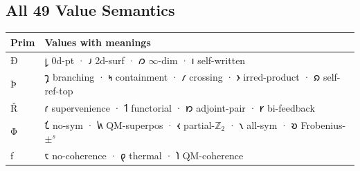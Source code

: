 \documentclass[12pt,a4paper]{article}
\newcommand{\heb}[1]{{\igprimfont #1}}
\begin{document}
\hypertarget{all-49-value-semantics}{%
\subsection{All 49 Value Semantics}\label{all-49-value-semantics}}

\begin{longtable}[]{@{}ll@{}}
\toprule
\begin{minipage}[b]{0.47\columnwidth}\raggedright
Prim\strut
\end{minipage} & \begin{minipage}[b]{0.47\columnwidth}\raggedright
Values with meanings\strut
\end{minipage}\tabularnewline
\midrule
\endhead
\begin{minipage}[t]{0.47\columnwidth}\raggedright
\heb{Ð}\strut
\end{minipage} & \begin{minipage}[t]{0.47\columnwidth}\raggedright
𐑛 0d-pt · 𐑨 2d-surf · 𐑼 \(\infty\)-dim · 𐑦 self-written\strut
\end{minipage}\tabularnewline
\begin{minipage}[t]{0.47\columnwidth}\raggedright
\heb{Þ}\strut
\end{minipage} & \begin{minipage}[t]{0.47\columnwidth}\raggedright
𐑡 branching · 𐑰 containment · 𐑥 crossing · 𐑶 irred-product · 𐑸
self-ref-top\strut
\end{minipage}\tabularnewline
\begin{minipage}[t]{0.47\columnwidth}\raggedright
\heb{Ř}\strut
\end{minipage} & \begin{minipage}[t]{0.47\columnwidth}\raggedright
𐑩 supervenience · 𐑑 functorial · 𐑽 adjoint-pair · 𐑾 bi-feedback\strut
\end{minipage}\tabularnewline
\begin{minipage}[t]{0.47\columnwidth}\raggedright
\heb{Φ}\strut
\end{minipage} & \begin{minipage}[t]{0.47\columnwidth}\raggedright
𐑗 no-sym · 𐑿 QM-superpos · 𐑬 partial-\(\mathbb{Z}_2\) · 𐑯 all-sym · 𐑹
Frobenius-\(\pm^s\)\strut
\end{minipage}\tabularnewline
\begin{minipage}[t]{0.47\columnwidth}\raggedright
\heb{ƒ}\strut
\end{minipage} & \begin{minipage}[t]{0.47\columnwidth}\raggedright
𐑱 no-coherence · 𐑞 thermal · 𐑐 QM-coherence\strut

\end{minipage}
\end{longtable}
\end{document}
